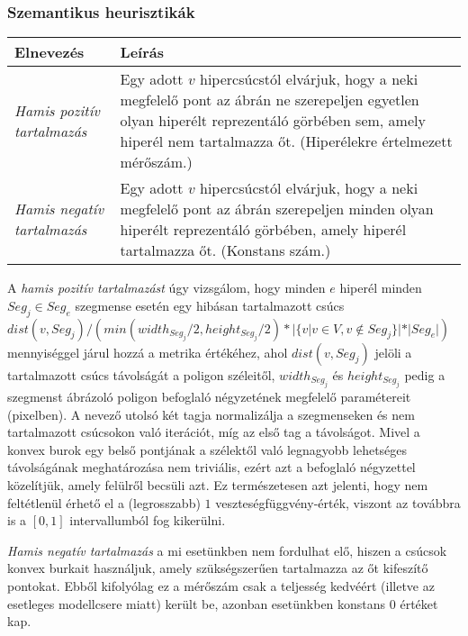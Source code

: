 \subsubsection{Szemantikus heurisztikák}

\begin{table}[H]
	\centering
	\begin{tabular}{ | m{} | m{} | }
		\hline
		\textbf{Elnevezés} & \textbf{Leírás} \\
		\hline \hline %
		\emph{Hamis pozitív tartalmazás} & Egy adott $v$ hipercsúcstól elvárjuk, hogy a neki megfelelő pont az ábrán ne szerepeljen egyetlen olyan hiperélt reprezentáló görbében sem, amely hiperél nem tartalmazza őt. (Hiperélekre értelmezett mérőszám.) \\
		\hline
		\emph{Hamis negatív tartalmazás} & Egy adott $v$ hipercsúcstól elvárjuk, hogy a neki megfelelő pont az ábrán szerepeljen minden olyan hiperélt reprezentáló görbében, amely hiperél tartalmazza őt. (Konstans szám.) \\
		\hline
	\end{tabular}
\end{table}

A \textit{hamis pozitív tartalmazást} úgy vizsgálom, hogy minden $e$ hiperél minden $Seg_j \in Seg_{e}$ szegmense esetén egy hibásan tartalmazott csúcs $dist(v, Seg_j) / (min(width_{Seg_j} / 2, height_{Seg_j} / 2)*|\{v | v \in V, v \notin Seg_j\}|*|Seg_{e}|)$ mennyiséggel járul hozzá a metrika értékéhez, ahol $dist(v, Seg_j)$ jelöli a tartalmazott csúcs távolságát a poligon széleitől, $width_{Seg_j}$ és $height_{Seg_j}$ pedig a szegmenst ábrázoló poligon befoglaló négyzetének megfelelő paramétereit (pixelben). A nevező utolsó két tagja normalizálja a szegmenseken és nem tartalmazott csúcsokon való iterációt, míg az első tag a távolságot. Mivel a konvex burok egy belső pontjának a szélektől való legnagyobb lehetséges távolságának meghatározása nem triviális, ezért azt a befoglaló négyzettel közelítjük, amely felülről becsüli azt. Ez természetesen azt jelenti, hogy nem feltétlenül érhető el a (legrosszabb) $1$ veszteségfüggvény-érték, viszont az továbbra is a $[0, 1]$ intervallumból fog kikerülni.

\textit{Hamis negatív tartalmazás} a mi esetünkben nem fordulhat elő, hiszen a csúcsok konvex burkait használjuk, amely szükségszerűen tartalmazza az őt kifeszítő pontokat. Ebből kifolyólag ez a mérőszám csak a teljesség kedvéért (illetve az esetleges modellcsere miatt) került be, azonban esetünkben konstans $0$ értéket kap.

